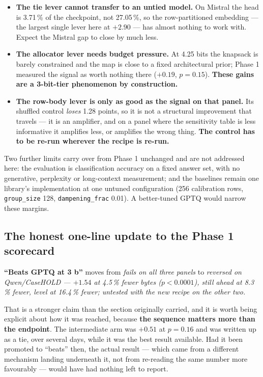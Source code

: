 \documentclass[11pt]{article}
\newcommand{\pct}{\,\%}
\newcommand{\code}[1]{\texttt{#1}}
\newenvironment{aside}%
{\par\needspace{4\baselineskip}\vspace{0.8ex}%
\begin{lrbox}{\asidebox}\begin{minipage}{\dimexpr\textwidth-18pt\relax}\small}%
{\end{minipage}\end{lrbox}%
\noindent\setlength{\fboxsep}{9pt}\colorbox{warnbg}{\usebox{\asidebox}}%
\vspace{0.6ex}\par}
\begin{document}
\begin{itemize}[leftmargin=1.4em]
\item \textbf{The tie lever cannot transfer to an untied model.} On Mistral the head is 3.71\pct{}
of the checkpoint, not 27.05\pct, so the row-partitioned embedding --- the largest single lever
here at $+2.90$ --- has almost nothing to work with. Expect the Mistral gap to close by much less.

\item \textbf{The allocator lever needs budget pressure.} At 4.25 bits the knapsack is barely
constrained and the map is close to a fixed architectural prior; Phase 1 measured the signal as
worth nothing there ($+0.19$, $p = 0.15$). \textbf{These gains are a 3-bit-tier phenomenon by
construction.}

\item \textbf{The row-body lever is only as good as the signal on that panel.} Its shuffled control
\emph{loses} 1.28 points, so it is not a structural improvement that travels --- it is an
amplifier, and on a panel where the sensitivity table is less informative it amplifies less, or
amplifies the wrong thing. \textbf{The control has to be re-run wherever the recipe is re-run.}
\end{itemize}

Two further limits carry over from Phase 1 unchanged and are not addressed here: the evaluation is
classification accuracy on a fixed answer set, with no generative, perplexity or long-context
measurement; and the baselines remain one library's implementation at one untuned configuration
(256 calibration rows, \code{group\_size} 128, \code{dampening\_frac} 0.01). A better-tuned GPTQ
would narrow these margins.

\subsection{The honest one-line update to the Phase 1 scorecard}

\begin{aside}
\textbf{``Beats GPTQ at 3 b''} moves from \emph{fails on all three panels} to \emph{reversed on
Qwen/CaseHOLD --- $+1.54$ at 4.5\pct{} fewer bytes ($p < 0.0001$), still ahead at 8.3\pct{} fewer,
level at 16.4\pct{} fewer; untested with the new recipe on the other two.}
\end{aside}

That is a stronger claim than the section originally carried, and it is worth being explicit about
how it was reached, because \textbf{the sequence matters more than the endpoint}. The intermediate
arm was $+0.51$ at $p = 0.16$ and was written up as a tie, over several days, while it was the best
result available. Had it been promoted to ``beats'' then, the actual result --- which came from a
different mechanism landing underneath it, not from re-reading the same number more favourably ---
would have had nothing left to report.
\end{document}
